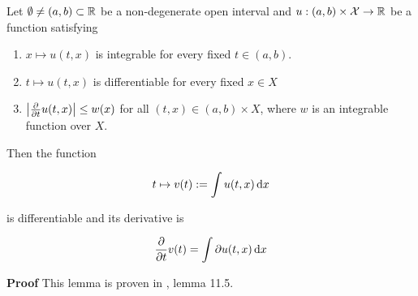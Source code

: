 
\begin{lemma}\label{DiffLemma}
 Let $\emptyset \neq (a,b)\subset\mathbb R$ be a non-degenerate open interval and $u:(a,b)\times \mathcal{X}\to \mathbb R$ be a function satisfying
\begin{enumerate}
  \item $x\mapsto u(t,x)$ is integrable for every fixed $t\in(a,b)$.
  \item $t\mapsto u(t,x)$ is differentiable for every fixed $x\in X$
  \item $\left| {\frac{\partial}{\partial t} u(t,x)} \right|\leq w(x)$ for all $(t,x)\in (a,b)\times X$, where $w$ is an integrable function over $X$.
\end{enumerate}

Then the function 

\begin{equation}
  t\mapsto v(t):=\int u(t,x) \,{\rm d} x
\end{equation}

is differentiable and its derivative is

\begin{equation}
  \frac{\partial}{\partial t} v(t) = \int \partial u(t,x) \,{\rm d} x
\end{equation}
\end{lemma}
\textbf{Proof} This lemma is proven in \cite[p.~92]{schilling.11}, lemma 11.5.\\
